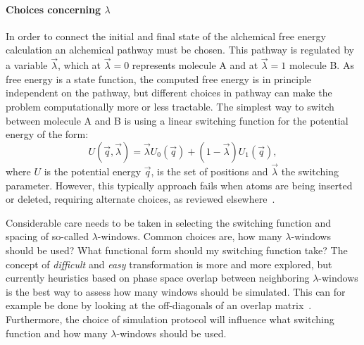 \documentclass[9pt,bestpractices]{livecoms}
\begin{document}
\paragraph{Choices concerning $\lambda$}
In order to connect the initial and final state of the alchemical free energy calculation an alchemical pathway must be chosen. This pathway is regulated by a variable $\vec{\lambda}$, which at $\vec{\lambda}=0$ represents molecule A and at $\vec{\lambda}=1$ molecule B. As free energy is a state function, the computed free energy is in principle independent on the pathway, but different choices in pathway can make the problem computationally more or less tractable. The simplest way to switch between molecule A and B is using a linear switching function for the potential energy of the form:
\begin{equation}
U(\vec{q},\vec{\lambda}) = \vec{\lambda} U_0(\vec{q}) + (1-\vec{\lambda})U_1(\vec{q}),
\end{equation}
where $U$ is the potential energy $\vec{q}$, is the set of positions and $\vec{\lambda}$ the switching parameter. However, this typically approach fails when atoms are being inserted or deleted, requiring alternate choices, as reviewed elsewhere~\cite{meyBestPracticesAlchemical2020}.

Considerable care needs to be taken in selecting the switching function and spacing of so-called $\lambda$-windows. Common choices are, how many $\lambda$-windows should be used? What functional form should my switching function take? The concept of \textit{difficult} and \textit{easy} transformation is more and more explored, but currently heuristics based on phase space overlap between neighboring $\lambda$-windows is the best way to assess how many windows should be simulated. This can for example be done by looking at the off-diagonals of an overlap matrix~\cite{klimovich_guidelines_2015,kuhn_assessment_2020}. Furthermore, the choice of simulation protocol will influence what switching function and how many $\lambda$-windows should be used. 
\end{document}
